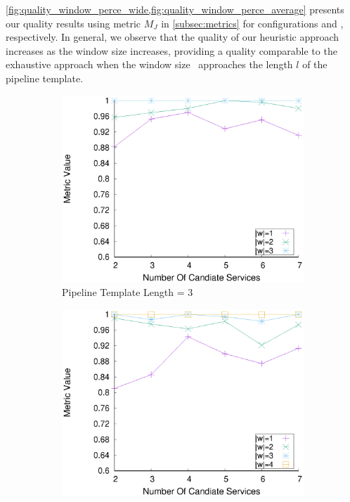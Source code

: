     {\color{OurColor2}\cref{fig:quality_window_perce_wide,fig:quality_window_perce_average} presents} our quality results using metric $M_J$ in \cref{subsec:metrics} for configurations \wide and \average, respectively.
    In general, we observe that the quality of our heuristic approach increases as the window size increases, providing a quality comparable to the exhaustive approach when the window size \windowsize\ approaches the length $l$ of the pipeline template.
    \begin{figure}[ht!]
      \centering
      \begin{subfigure}{0.49\textwidth}
        \includegraphics[width=\textwidth]{Images/graphs/window_quality_performance_diff_perce_n7_s7_20_100_n3}
        \caption{Pipeline Template Length = 3}
        \label{fig:quality_window_wide_perce_n3}
      \end{subfigure}
      \hfill
      \begin{subfigure}{0.49\textwidth}
        \includegraphics[width=\textwidth]{Images/graphs/window_quality_performance_diff_perce_n7_s7_20_100_n4}

\end{subfigure}
\end{figure}
